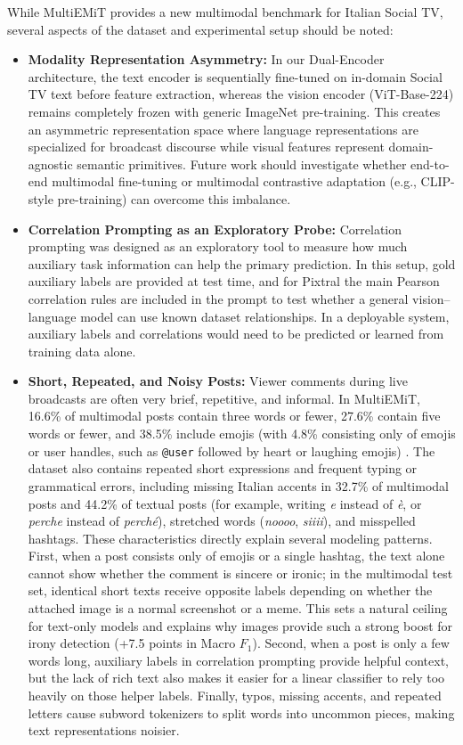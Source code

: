 While MultiEMiT provides a new multimodal benchmark for Italian Social TV, several aspects of the dataset and experimental setup should be noted:
\begin{itemize}
    \item \textbf{Modality Representation Asymmetry:} In our Dual-Encoder architecture, the text encoder is sequentially fine-tuned on in-domain Social TV text before feature extraction, whereas the vision encoder (ViT-Base-224) remains completely frozen with generic ImageNet pre-training. This creates an asymmetric representation space where language representations are specialized for broadcast discourse while visual features represent domain-agnostic semantic primitives. Future work should investigate whether end-to-end multimodal fine-tuning or multimodal contrastive adaptation (e.g., CLIP-style pre-training) can overcome this imbalance.
    \item \textbf{Correlation Prompting as an Exploratory Probe:} Correlation prompting was designed as an exploratory tool to measure how much auxiliary task information can help the primary prediction. In this setup, gold auxiliary labels are provided at test time, and for Pixtral the main Pearson correlation rules are included in the prompt to test whether a general vision--language model can use known dataset relationships. In a deployable system, auxiliary labels and correlations would need to be predicted or learned from training data alone.
    \item \textbf{Short, Repeated, and Noisy Posts:} Viewer comments during live broadcasts are often very brief, repetitive, and informal. In MultiEMiT, 16.6\% of multimodal posts contain three words or fewer, 27.6\% contain five words or fewer, and 38.5\% include emojis (with 4.8\% consisting only of emojis or user handles, such as \texttt{@user} followed by heart or laughing emojis) \cite{felbo2017using}. The dataset also contains repeated short expressions and frequent typing or grammatical errors, including missing Italian accents in 32.7\% of multimodal posts and 44.2\% of textual posts (for example, writing \textit{e} instead of \textit{\`e}, or \textit{perche} instead of \textit{perch\'e}), stretched words (\textit{noooo}, \textit{siiii}), and misspelled hashtags. These characteristics directly explain several modeling patterns. First, when a post consists only of emojis or a single hashtag, the text alone cannot show whether the comment is sincere or ironic; in the multimodal test set, identical short texts receive opposite labels depending on whether the attached image is a normal screenshot or a meme. This sets a natural ceiling for text-only models and explains why images provide such a strong boost for irony detection (+7.5 points in Macro $F_1$). Second, when a post is only a few words long, auxiliary labels in correlation prompting provide helpful context, but the lack of rich text also makes it easier for a linear classifier to rely too heavily on those helper labels. Finally, typos, missing accents, and repeated letters cause subword tokenizers to split words into uncommon pieces, making text representations noisier.

\end{itemize}
